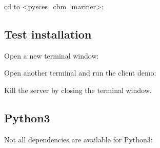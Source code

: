 \documentclass[letterpaper,10pt,english]{sphinxmanual}
\begin{document}
\sphinxAtStartPar
cd to \textless{}pysces\_cbm\_mariner\textgreater{}:

\begin{sphinxVerbatim}[commandchars=\\\{\}]
   
   
\end{sphinxVerbatim}


\subsection{Test installation}
\label{\detokenize{install_doc:test-installation}}
\sphinxAtStartPar
Open a new terminal window:

\begin{sphinxVerbatim}[commandchars=\\\{\}]
 
\end{sphinxVerbatim}

\sphinxAtStartPar
Open another terminal and run the client demo:

\begin{sphinxVerbatim}[commandchars=\\\{\}]
 
\end{sphinxVerbatim}

\sphinxAtStartPar
Kill the server by closing the terminal window.


\subsection{Python3}
\label{\detokenize{install_doc:python3}}
\sphinxAtStartPar
Not all dependencies are available for Python3:
\end{document}

